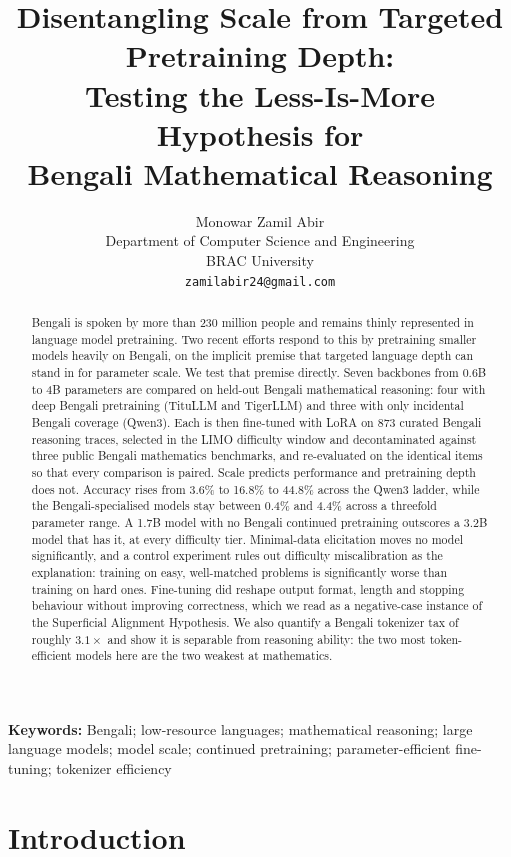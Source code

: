 \documentclass[10pt,twocolumn,letterpaper]{article}
\title{\bfseries Disentangling Scale from Targeted Pretraining Depth:\\
Testing the Less-Is-More Hypothesis for\\
Bengali Mathematical Reasoning}
\author{Monowar Zamil Abir\\
Department of Computer Science and Engineering\\
BRAC University\\
\texttt{zamilabir24@gmail.com}}
\date{}
\begin{document}
\maketitle


\begin{abstract}
Bengali is spoken by more than 230 million people and remains thinly
represented in language model pretraining. Two recent efforts respond to this
by pretraining smaller models heavily on Bengali, on the implicit premise that
targeted language depth can stand in for parameter scale. We test that premise
directly. Seven backbones from 0.6B to 4B parameters are compared on held-out
Bengali mathematical reasoning: four with deep Bengali pretraining (TituLLM and
TigerLLM) and three with only incidental Bengali coverage (Qwen3). Each is then
fine-tuned with LoRA on 873 curated Bengali reasoning traces, selected in the
LIMO difficulty window and decontaminated against three public Bengali
mathematics benchmarks, and re-evaluated on the identical items so that every
comparison is paired. Scale predicts performance and pretraining depth does
not. Accuracy rises from 3.6\% to 16.8\% to 44.8\% across the Qwen3 ladder,
while the Bengali-specialised models stay between 0.4\% and 4.4\% across a
threefold parameter range. A 1.7B model with no Bengali continued pretraining
outscores a 3.2B model that has it, at every difficulty tier. Minimal-data
elicitation moves no model significantly, and a control experiment rules out
difficulty miscalibration as the explanation: training on easy, well-matched
problems is significantly worse than training on hard ones. Fine-tuning did
reshape output format, length and stopping behaviour without improving
correctness, which we read as a negative-case instance of the Superficial
Alignment Hypothesis. We also quantify a Bengali tokenizer tax of roughly
$3.1\times$ and show it is separable from reasoning ability: the two most
token-efficient models here are the two weakest at mathematics.
\end{abstract}

\vspace{0.5em}
\noindent\textbf{Keywords:} Bengali; low-resource languages; mathematical
reasoning; large language models; model scale; continued pretraining;
parameter-efficient fine-tuning; tokenizer efficiency

\section{Introduction}
\end{document}
